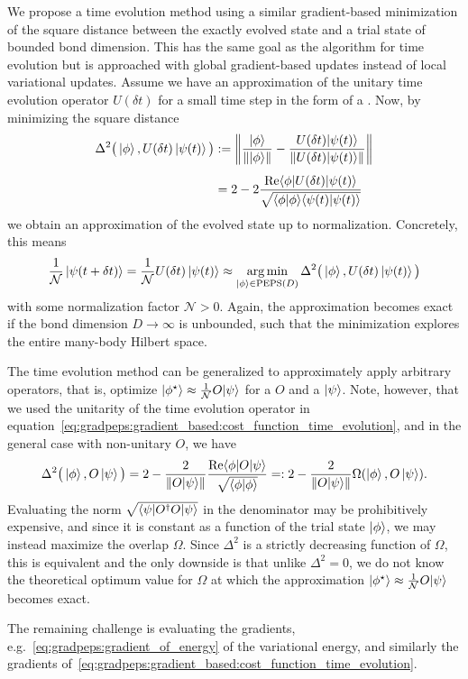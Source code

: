 We propose a time evolution method using a similar gradient-based minimization of the square distance between the exactly evolved state and a trial state of bounded bond dimension.
%
This has the same goal as the  algorithm for  time evolution but is approached with global gradient-based updates instead of local variational updates.
%
Assume we have an approximation of the unitary time evolution operator $U(\delta t)$ for a small time step in the form of a .
%
Now, by minimizing the square distance
\begin{align}
    \label{eq:gradpeps:gradient_based:cost_function_time_evolution}
    \begin{split}
        \Delta^2 \big(\ket{\phi}, U(\delta t) \ket{\psi(t)} \big)
        &:= \norm{
            \frac{\ket{\phi}}{\norm{\ket{\phi}}}
            - \frac{ U (\delta t) \ket{\psi(t)} }{\norm{U (\delta t) \ket{\psi(t)}}}
        }
        \\[1ex]
        &=
        2 - 2 \frac{\mathrm{Re} \braopket{\phi}{U (\delta t)}{\psi(t)}}{\sqrt{\braket{\phi}{\phi}\braket{\psi(t)}{\psi(t)}}}
    \end{split}
\end{align}
we obtain an approximation of the evolved state up to normalization.
%
Concretely, this means
\begin{equation}
    \frac{1}{\mathcal{N}} \ket{\psi(t + \delta t)}
    = \frac{1}{\mathcal{N}} U(\delta t)\ket{\psi(t)}
    \approx \argmin_{\ket{\phi}\in\text{PEPS}(D)} \Delta^2 \big(\ket{\phi}, U(\delta t) \ket{\psi(t)} \big)
\end{equation}
with some normalization factor $\mathcal{N} > 0$.
%
Again, the approximation becomes exact if the bond dimension $D \to \infty$ is unbounded, such that the minimization explores the entire many-body Hilbert space.



The time evolution method can be generalized to approximately apply arbitrary operators, that is, optimize $\ket{\phi^\star} \approx \tfrac{1}{\mathcal{N}} O \psiket$ for a  $O$ and a  $\psiket$.
%
Note, however, that we used the unitarity of the time evolution operator in equation~\eqref{eq:gradpeps:gradient_based:cost_function_time_evolution}, and in the general case with non-unitary $O$, we have
\begin{equation}
    \Delta^2 \big(\ket{\phi}, O \ket{\psi} \big)
    = 2 - \frac{2}{\norm{O\psiket}}  \frac{\mathrm{Re} \braopket{\phi}{O}{\psi}}{\sqrt{\braket{\phi}{\phi}}}
    =: 2 - \frac{2}{\norm{O\psiket}} \Omega(\ket{\phi}, O \ket{\psi})
    .
\end{equation}
Evaluating the norm $\sqrt{\braopket{\psi}{O^\dagger O}{\psi}}$ in the denominator may be prohibitively expensive, and since it is constant as a function of the trial state $\ket{\phi}$, we may instead maximize the overlap $\Omega$.
%
Since $\Delta^2$ is a strictly decreasing function of $\Omega$, this is equivalent and the only downside is that unlike $\Delta^2 = 0$, we do not know the theoretical optimum value for $\Omega$ at which the approximation $\ket{\phi^\star} \approx \tfrac{1}{\mathcal{N}} O \psiket$ becomes exact.



The remaining challenge is evaluating the gradients, e.g.~\eqref{eq:gradpeps:gradient_of_energy} of the variational energy, and similarly the gradients of~\eqref{eq:gradpeps:gradient_based:cost_function_time_evolution}.
